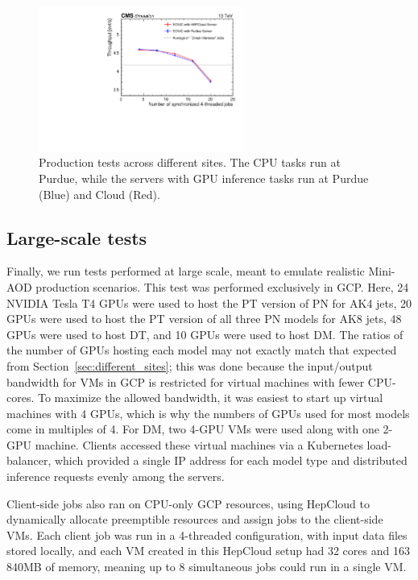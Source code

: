 \begin{figure}[htp]
    \centering
    \includegraphics[width=0.60\textwidth]{plots/throughput_crosssite.pdf}
    \caption{Production tests across different sites. The CPU tasks run at Purdue, while the servers with GPU inference tasks run at Purdue (Blue) and Cloud (Red).}
    \label{fig:crosssites}
\end{figure}

\subsection{Large-scale tests}
\label{sec:scale_out}

Finally, we run tests performed at large scale, meant to emulate realistic Mini-AOD production scenarios. This test was performed exclusively in GCP. Here, 24 NVIDIA Tesla T4 GPUs were used to host the PT version of PN for AK4 jets, 20 GPUs were used to host the PT version of all three PN models for AK8 jets, 48 GPUs were used to host DT, and 10 GPUs were used to host DM. The ratios of the number of GPUs hosting each model may not exactly match that expected from Section~\ref{sec:different_sites}; this was done because the input/output bandwidth for VMs in GCP is restricted for virtual machines with fewer CPU-cores. To maximize the allowed bandwidth, it was easiest to start up virtual machines with 4 GPUs, which is why the numbers of GPUs used for most models come in multiples of 4. For DM, two 4-GPU VMs were used along with one 2-GPU machine. Clients accessed these virtual machines via a Kubernetes load-balancer, which provided a single IP address for each model type and distributed inference requests evenly among the servers.

Client-side jobs also ran on CPU-only GCP resources, using HepCloud to dynamically allocate preemptible resources and assign jobs to the client-side VMs. Each client job was run in a 4-threaded configuration, with input data files stored locally, and each VM created in this HepCloud setup had 32 cores and 163\,840\unit{MB} of memory, meaning up to 8 simultaneous jobs could run in a single VM.

